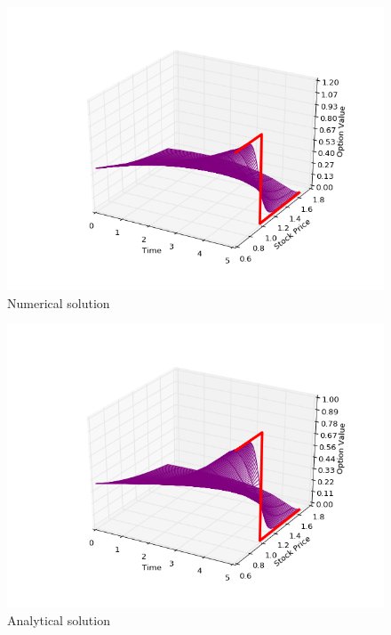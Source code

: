 \documentclass[11pt,a4paper]{extarticle}
\begin{document}
\begin{minipage}{\linewidth}
      \centering
      \begin{minipage}{0.3\linewidth}
          \begin{figure}[H]
              \includegraphics[width=\linewidth]{Figures/c-o-n-put-num}
              \caption{Numerical solution}
          \end{figure}
      \end{minipage}
      \hspace{0.05\linewidth}
      \begin{minipage}{0.3\linewidth}
          \begin{figure}[H]
              \includegraphics[width=\linewidth]{Figures/c-o-n-put-analyt}
              \caption{Analytical solution}
          \end{figure}
      \end{minipage}
  \end{minipage}
\end{document}
